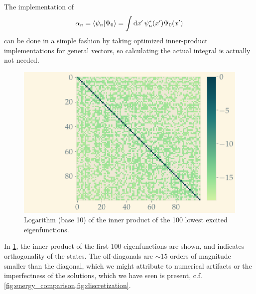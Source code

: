 The implementation of 
\begin{equation} 
\alpha_n = \braket{\psi_n}{\Psi_0} = \int\dd{x'}\psi_n^*(x')\Psi_0(x')
\end{equation}
can be done in a simple fashion by taking optimized inner-product implementations for general vectors, so calculating the actual integral is actually not needed. 
\begin{figure}
	\centering
	\includegraphics[width=\linewidth, trim={2.5cm 0 0 0}, clip]{img/ortho.png}
	\caption{Logarithm (base 10) of the inner product of the 100 lowest excited eigenfunctions.}
	\label{fig:orthogonality}
\end{figure}
In \cref{fig:orthogonality}, the inner product of the first 100 eigenfunctions are shown, and indicates orthogonality of the states. The off-diagonals are $\sim 15 $ orders of magnitude smaller than the diagonal, which we might attribute to numerical artifacts or the imperfectness of the solutions, which we have seen is present, c.f. \cref{fig:energy_comparison,fig:discretization}. 

